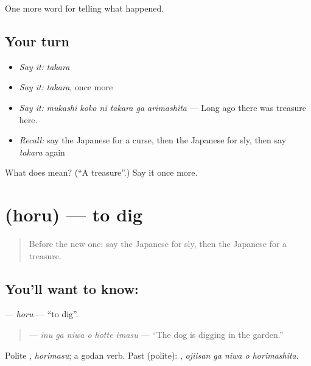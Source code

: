 \begin{grammarlens}[title={What you've built}]
One more word for telling what happened.
\end{grammarlens}

\subsection*{Your turn}
\begin{itemize}
\raggedright
  \item \emph{Say it:} \emph{takara}
  \item \emph{Say it:} \emph{takara}, once more
  \item \emph{Say it:} \emph{mukashi koko ni takara ga arimashita} — Long ago there was treasure here.
  \item \emph{Recall:} say the Japanese for a curse, then the Japanese for sly, then say \emph{takara} again
\end{itemize}

\begin{tcolorbox}[breakable,colback=teal!4,colframe=teal!35!black,title={Before you move on}]
What does  mean? (\textquotedblleft{}A treasure\textquotedblright{}.) Say it once more.
\end{tcolorbox}
\section[\texorpdfstring{\ja{ほる} (horu)}{ほる (horu)}]{ (horu) — to dig}

\label{lesson:JA-C301-horu}



\begin{quote}
Before the new one: say the Japanese for sly, then the Japanese for a treasure.
\end{quote}

\subsection*{You'll want to know: }
\textbf{} — \emph{horu} — \textquotedblleft{}to dig\textquotedblright{}.

\begin{quote}
\textbf{  } — \emph{inu ga niwa o hotte imasu} — \textquotedblleft{}The dog is digging in the garden.\textquotedblright{}
\end{quote}

Polite \textbf{}, \emph{horimasu}; a godan verb. Past (polite): \textbf{  }, \emph{ojiisan ga niwa o horimashita}.

